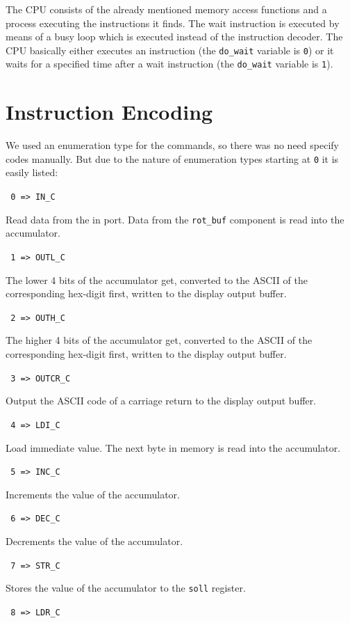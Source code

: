 \documentclass[a4paper,10pt]{scrartcl}
\begin{document}
The CPU consists of the already mentioned memory access functions and a process executing the instructions it finds. 
The wait instruction is executed by means of a busy loop which is executed instead of the instruction decoder. 
The CPU basically either executes an instruction (the \texttt{do\_wait} variable is \texttt{0}) or it waits for a specified time after a wait instruction (the \texttt{do\_wait} variable is \texttt{1}). 

\section{Instruction Encoding}
\label{sec:bef_cod}

We used an enumeration type for the commands, so there was no need specify codes manually. 
But due to the nature of enumeration types starting at \texttt{0} it is easily listed: 

\noindent\texttt{ 0  =>  IN\_C}

Read data from the in port. Data from the \texttt{rot\_buf} component is read into the accumulator.

\noindent\texttt{ 1  =>  OUTL\_C}

The lower 4 bits of the accumulator get, converted to the ASCII of the corresponding hex-digit first, written to the display output buffer.

\noindent\texttt{ 2  =>  OUTH\_C}

The higher 4 bits of the accumulator get, converted to the ASCII of the corresponding hex-digit first, written to the display output buffer.

\noindent\texttt{ 3  =>  OUTCR\_C}

Output the ASCII code of a carriage return to the display output buffer.

\noindent\texttt{ 4  =>  LDI\_C}

Load immediate value. The next byte in memory is read into the accumulator.

\noindent\texttt{ 5  =>  INC\_C}

Increments the value of the accumulator.

\noindent\texttt{ 6  =>  DEC\_C}

Decrements the value of the accumulator.

\noindent\texttt{ 7  =>  STR\_C}

Stores the value of the accumulator to the \texttt{soll} register.

\noindent\texttt{ 8  =>  LDR\_C}
\end{document}
